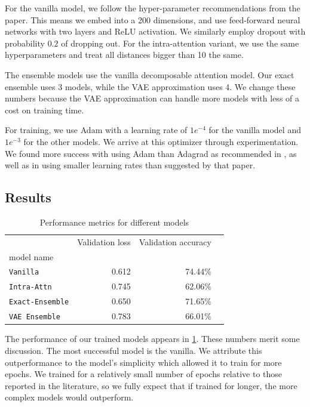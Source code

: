 \documentclass[12pt]{article}
\begin{document}
For the vanilla model, we follow the hyper-parameter recommendations from the
paper. This means we embed into a 200 dimensions, and use feed-forward neural
networks with two layers and ReLU activation. We similarly employ dropout with
probability $0.2$ of dropping out. For the intra-attention variant, we use the
same hyperparameters and treat all distances bigger than 10 the same.

The ensemble models use the vanilla decomposable attention model. Our exact
ensemble uses 3 models, while the VAE approximation uses 4. We change these
numbers because the VAE approximation can handle more models with less of a cost
on training time. 

For training, we use Adam with a learning rate of $1e^{-4}$ for the vanilla
model and $1e^{-3}$ for the other models. We arrive at this optimizer through
experimentation. We found more success with using Adam than Adagrad as
recommended in \cite{parikh2016decomposable}, as well as in using smaller
learning rates than suggested by that paper.

\subsection{Results}

\begin{table}[h]
\centering
\begin{tabular}{lrrr}
\toprule
{}                                     & Validation loss & Validation accuracy \\
model name                             &       &        & \\
\midrule
\texttt{Vanilla}                      & 0.612  & 74.44\% \\
\texttt{Intra-Attn}  & 0.745   & 62.06\% \\
\texttt{Exact-Ensemble}  & 0.650   & 71.65\% \\
\texttt{VAE Ensemble} & 0.783 & 66.01\% \\
\bottomrule
\end{tabular}
\caption{Performance metrics for different models}
\label{table:performance}
\end{table}

The performance of our trained models appears in \cref{table:performance}. These
numbers merit some discussion. The most successful model is the vanilla. We
attribute this outperformance to the model's simplicity which allowed it to
train for more epochs. We trained for a relatively small number of epochs
relative to those reported in the literature, so we fully expect that if trained
for longer, the more complex models would outperform.
\end{document}
